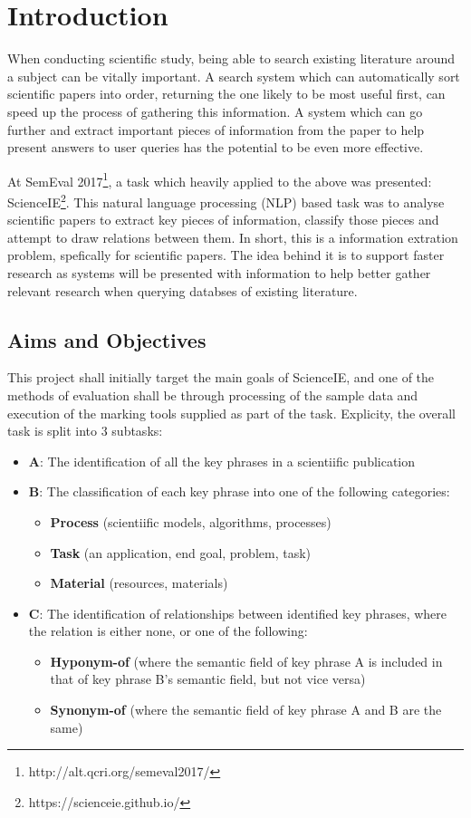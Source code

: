 \section{Introduction}

When conducting scientific study, being able to search existing literature around a subject can be vitally important. A search system which can automatically sort scientific papers into order, returning the one likely to be most useful first, can speed up the process of gathering this information. A system which can go further and extract important pieces of information from the paper to help present answers to user queries has the potential to be even more effective.

At SemEval 2017\footnote{http://alt.qcri.org/semeval2017/}, a task which heavily applied to the above was presented: ScienceIE\footnote{https://scienceie.github.io/}. This natural language processing (NLP) based task was to analyse scientific papers to extract key pieces of information, classify those pieces and attempt to draw relations between them. In short, this is a information extration problem, spefically for scientific papers. The idea behind it is to support faster research as systems will be presented with information to help better gather relevant research when querying databses of existing literature.

\subsection{Aims and Objectives}

This project shall initially target the main goals of ScienceIE, and one of the methods of evaluation shall be through processing of the sample data and execution of the marking tools supplied as part of the task. Explicity, the overall task is split into 3 subtasks:

\begin{itemize}
	\item \textbf{A}: The identification of all the key phrases in a scientiific publication
	\item \textbf{B}: The classification of each key phrase into one of the following categories:
	\begin{itemize}
		\item \textbf{Process} (scientiific models, algorithms, processes)
		\item \textbf{Task} (an application, end goal, problem, task)
		\item \textbf{Material} (resources, materials)
	\end{itemize}
	\item \textbf{C}: The identification of relationships between identified key phrases, where the relation is either none, or one of the following:
	\begin{itemize}
		\item \textbf{Hyponym-of} (where the semantic field of key phrase A is included in that of key phrase B's semantic field, but not vice versa)
		\item \textbf{Synonym-of} (where the semantic field of key phrase A and B are the same)
	\end{itemize}
\end{itemize}

